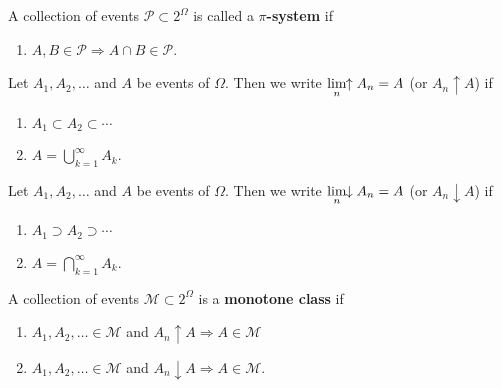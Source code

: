 \begin{definition}[{\bf $\pi$-system}]
A  collection of events $\mathcal P\subset 2^\Omega$ is called a {\bf $\pi$-system} if
\begin{enumerate}
\item $A, B\in\mathcal P \Longrightarrow A\cap B\in\mathcal P$.
\end{enumerate}
\end{definition}




\begin{definition}[{\bf $A_n\uparrow A$}]
Let $A_1, A_2, \ldots$  and $A$ be events of $\Omega$. Then we write $\displaystyle\lim_{n}\!\!\uparrow A_n = A$ (or $A_n\uparrow A$) if
\begin{enumerate}
\item $A_1\subset A_2 \subset \cdots$
\item $A=\bigcup_{k=1}^\infty A_k$.
\end{enumerate}
\end{definition}

\begin{definition}[{\bf $A_n\downarrow A$}]
Let $A_1, A_2, \ldots$  and $A$ be events of $\Omega$. Then we write $\displaystyle\lim_{n}\!\!\downarrow A_n = A$ (or $A_n\downarrow A$) if
\begin{enumerate}
\item $A_1\supset A_2 \supset \cdots$
\item $A=\bigcap_{k=1}^\infty A_k$.
\end{enumerate}
\end{definition}



\begin{definition}
A collection of events $\mathcal M\subset 2^\Omega$  is a {\bf monotone class} if
\begin{enumerate}
\item $A_1, A_2,\ldots\in\mathcal M$ and $A_n\uparrow A \Longrightarrow A\in\mathcal M$
\item $A_1, A_2,\ldots\in\mathcal M$ and $A_n\downarrow A \Longrightarrow A\in\mathcal M$.
\end{enumerate}
\end{definition}





